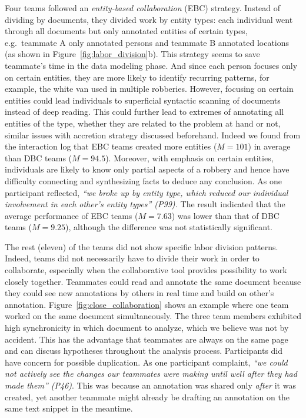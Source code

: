 Four teams followed an \emph{entity-based collaboration} (EBC)
strategy. Instead of dividing by documents, they divided work by entity
types: each individual went through all documents but only annotated
entities of certain types, e.g.~teammate A only annotated persons and
teammate B annotated locations (as shown in
Figure~\ref{fig:labor_division}b). This strategy seems to save teammate's time in the
data modeling phase. And since each person focuses only on certain entities,
they are more likely to identify recurring patterns, for example, the
white van used in multiple robberies. However, focusing on certain
entities could lead individuals to superficial syntactic scanning of
documents instead of deep reading. This could further lead to extremes
of annotating all entities of the type, whether they are related to the
problem at hand or not, similar issues with accretion strategy discussed
beforehand. Indeed we found from the interaction log that EBC teams
created more entities ($M=101$) in average than DBC teams ($M=94.5$).
Moreover, with emphasis on certain entities,
individuals are likely to know only partial aspects of a robbery and
hence have difficulty connecting and synthesizing facts to deduce any
conclusion. As one participant reflected, \emph{``we broke up by entity
type, which reduced our individual involvement in each other's entity
types'' (P99).} The result indicated that the average performance of EBC teams ($M=7.63$) was lower
than that of DBC teams ($M=9.25$), although the difference was not statistically significant.

The rest (eleven) of the teams did not show specific labor division
patterns. Indeed, teams did not necessarily have to divide their work in
order to collaborate, especially when the collaborative tool provides
possibility to work closely together. Teammates could read and annotate
the same document because they could see new annotations by others in
real time and build on other's annotation. Figure~\ref{fig:close_collaboration}
shows an example where one team worked on the same document simultaneously.
The three team members exhibited high synchronicity in which document to
analyze, which we believe was not by accident. This has the advantage that
teammates are always on the same page and can discuss hypotheses
throughout the analysis process. Participants did have concern for
possible duplication. As one participant complaint, \emph{``we could not
actively see the changes our teammates were making until well after they
had made them'' (P46)}. This was because an annotation was shared only
\emph{after} it was created, yet another teammate might already be drafting an
annotation on the same text snippet in the meantime.

